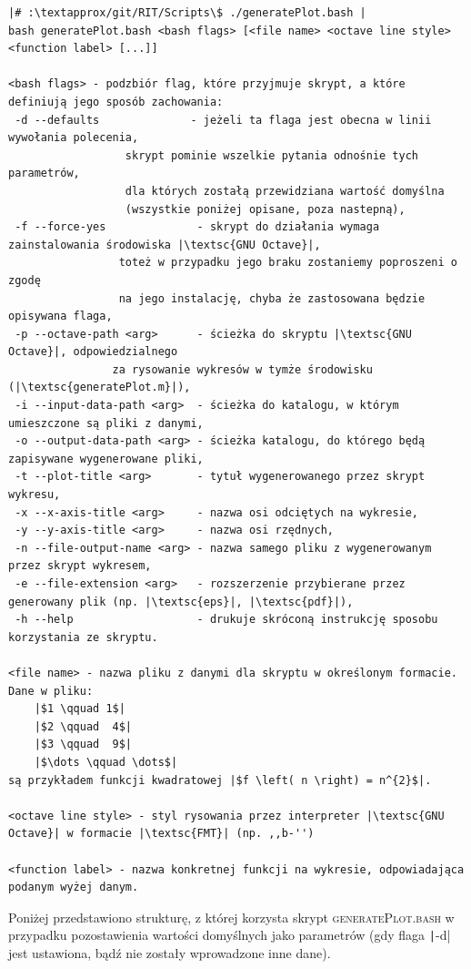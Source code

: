 \begin{verbatim}
|# :\textapprox/git/RIT/Scripts\$ ./generatePlot.bash |
bash generatePlot.bash <bash flags> [<file name> <octave line style> <function label> [...]]

<bash flags> - podzbiór flag, które przyjmuje skrypt, a które definiują jego sposób zachowania:
 -d --defaults              - jeżeli ta flaga jest obecna w linii wywołania polecenia, 
			      skrypt pominie wszelkie pytania odnośnie tych parametrów,
			      dla których zostałą przewidziana wartość domyślna 
			      (wszystkie poniżej opisane, poza nastepną),
 -f --force-yes              - skrypt do działania wymaga zainstalowania środowiska |\textsc{GNU Octave}|, 
			     toteż w przypadku jego braku zostaniemy poproszeni o zgodę 
			     na jego instalację, chyba że zastosowana będzie opisywana flaga,
 -p --octave-path <arg>      - ścieżka do skryptu |\textsc{GNU Octave}|, odpowiedzialnego 
				za rysowanie wykresów w tymże środowisku  (|\textsc{generatePlot.m}|),
 -i --input-data-path <arg>  - ścieżka do katalogu, w którym umieszczone są pliki z danymi,
 -o --output-data-path <arg> - ścieżka katalogu, do którego będą zapisywane wygenerowane pliki,
 -t --plot-title <arg>       - tytuł wygenerowanego przez skrypt wykresu,
 -x --x-axis-title <arg>     - nazwa osi odciętych na wykresie,
 -y --y-axis-title <arg>     - nazwa osi rzędnych,
 -n --file-output-name <arg> - nazwa samego pliku z wygenerowanym przez skrypt wykresem,
 -e --file-extension <arg>   - rozszerzenie przybierane przez generowany plik (np. |\textsc{eps}|, |\textsc{pdf}|),
 -h --help                   - drukuje skróconą instrukcję sposobu korzystania ze skryptu.

<file name> - nazwa pliku z danymi dla skryptu w określonym formacie. Dane w pliku:
	|$1	\qquad 1$|
	|$2 \qquad	4$|
	|$3 \qquad	9$|
	|$\dots \qquad \dots$|
są przykładem funkcji kwadratowej |$f \left( n \right) = n^{2}$|.

<octave line style> - styl rysowania przez interpreter |\textsc{GNU Octave}| w formacie |\textsc{FMT}| (np. ,,b-'')

<function label> - nazwa konkretnej funkcji na wykresie, odpowiadająca podanym wyżej danym.
\end{verbatim}

Poniżej przedstawiono strukturę, z której korzysta skrypt \textsc{generatePlot.bash} w przypadku pozostawienia wartości domyślnych jako parametrów (gdy flaga \texttt|-d| jest ustawiona, bądź nie zostały wprowadzone inne dane).

